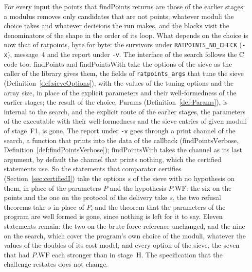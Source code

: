 For every input the points that $\mathrm{findPoints}$ returns are those of the earlier stages: a
modulus removes only candidates that are not points, whatever moduli the choice takes and whatever
decisions the run makes, and the blocks visit the denominators of the shape in the order of its
loop. What depends on the choice is now that of ratpoints, byte for byte: the survivors under
\verb|RATPOINTS_NO_CHECK| (\verb|-x|), message~4 and the report under \verb|-v|. The interface of
the search follows the C code too. $\mathrm{findPoints}$ and $\mathrm{findPointsWith}$ take the
options of the sieve as the caller of the library gives them, the fields of \verb|ratpoints_args|
that tune the sieve (Definition~\ref{def:sieveOptions}), with the values of the tuning options and
the array size, in place of the explicit parameters and their well-formedness of the earlier stages;
the result of the choice, $\mathrm{Params}$ (Definition~\ref{def:Params}), is internal to the
search, and the explicit route of the earlier stages, the parameters of the executable with their
well-formedness and the sieve entries of given moduli of stage~F1, is gone. The report under
\verb|-v| goes through a print channel of the search, a function that prints into the data of the
callback ($\mathrm{findPointsVerbose}$, Definition~\ref{def:findPointsVerbose});
$\mathrm{findPointsWith}$ takes the channel as its last argument, by default the channel that prints
nothing, which the certified statements use. So the statements that comparator certifies
(Section~\ref{sec:certifiedI}) take the options $s$ of the sieve with no hypothesis on them, in
place of the parameters $P$ and the hypothesis $P.\mathrm{WF}$: the six on the points and the one on
the protocol of the delivery take $s$, the two refusal theorems take $s$ in place of $P$, and the
theorem that the parameters of the program are well formed is gone, since nothing is left for it to
say. Eleven statements remain: the two on the brute-force reference unchanged, and the nine on the
search, which cover the program's own choice of the moduli, whatever the values of the doubles of
its cost model, and every option of the sieve, the seven that had $P.\mathrm{WF}$ each stronger than
in stage~H. The specification that the challenge restates does not change.

